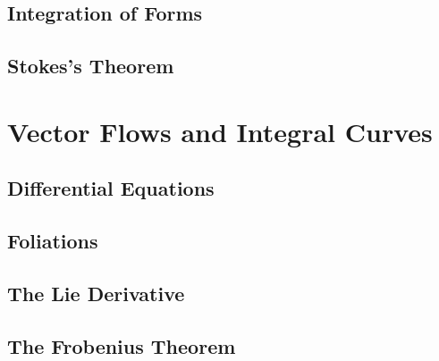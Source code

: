 \documentclass[oneside,english]{amsbook}
\numberwithin{section}{chapter}
\theoremstyle{plain}
\theoremstyle{definition}
\begin{document}
		\section{Integration of Forms}
		\section{Stokes's Theorem}


	\chapter{Vector Flows and Integral Curves}
	
		\section{Differential Equations}

		\section{Foliations}

		\section{The Lie Derivative}
	
		\section{The Frobenius Theorem}
\end{document}
